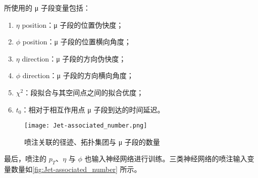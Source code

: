 所使用的 μ 子段变量包括：
\begin{enumerate}
      \item $\eta$ position：μ 子段的位置伪快度；
      \item $\phi$ position：μ 子段的位置横向角度；
      \item $\eta$ direction：μ 子段的方向伪快度；
      \item $\phi$ direction：μ 子段的方向横向角度；
      \item $\chi^2$：段拟合与其空间点之间的拟合优度；
      \item $t_0$：相对于相互作用点 μ 子段到达的时间延迟。
\end{enumerate}

\begin{figure}[ht]
      \centering
      \texttt{[image: Jet-associated\_number.png]}
      \caption{喷注关联的径迹、拓扑集团与 μ 子段的数量}
      \label{fig:Jet-associated_number}
\end{figure}

最后，喷注的 $p_T$、$\eta$ 与 $\phi$ 也输入神经网络进行训练。三类神经网络的喷注输入变量数量如\autoref{fig:Jet-associated_number} 所示。

